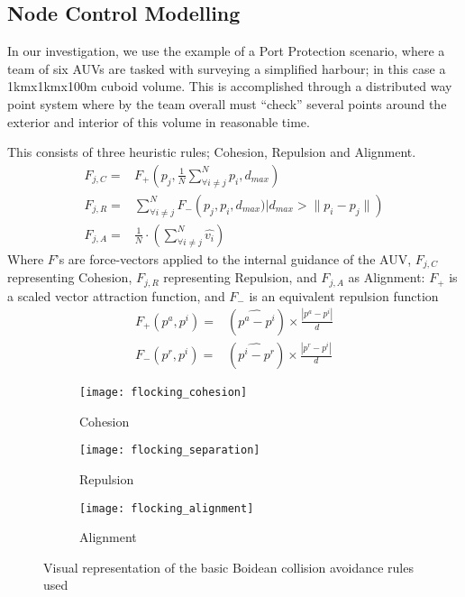 \subsection{Node Control Modelling}

In our investigation, we use the example of a Port Protection scenario, where a team of six AUVs are tasked with surveying a simplified harbour; in this case a 1kmx1kmx100m cuboid volume.
This is accomplished through a distributed way point system where by the team overall must ``check'' several points around the exterior and interior of this volume in reasonable time.

This consists of three heuristic rules; Cohesion, Repulsion and Alignment.
\begin{align}
  F_{j,C}=& F_+\left(p_j, \frac{1}{N}\sum\limits_{\forall i \ne j}^N{p_i}, d_{max}\right)\label{eq:fa}\\
  F_{j,R}=& \sum\limits_{\forall i \ne j}^N F_-\left(p_j, p_i, d_{max}) \big| d_{max}>\|p_i-p_j\|\right)\label{eq:fr}\\
  F_{j,A}=& \frac{1}{N}\cdot\left(\sum\limits_{\forall i \ne j}^N \hat{v_i}\right)\label{eq:fc}
\end{align}
Where $F$'s are force-vectors applied to the internal guidance of the AUV, $F_{j,C}$ representing Cohesion, $F_{j,R}$ representing Repulsion, and $F_{j,A}$ as Alignment: $F_+$ is a scaled vector attraction function, and $F_-$ is an equivalent repulsion function
\begin{align}
  F_+(p^a, p^i)=&(\widehat{p^a-p^i}) \times \frac{|p^a-p^i|}{d}\\
  F_-(p^r, p^i)=&(\widehat{p^i-p^r}) \times \frac{|p^r-p^i|}{d}
\end{align}

\begin{figure*}
  \centering
  \begin{subfigure}[t]{0.3\textwidth}
    \centering
    \texttt{[image: flocking\_cohesion]}
    \caption{Cohesion}
  \end{subfigure}
  \begin{subfigure}[t]{0.3\textwidth}
    \centering
    \texttt{[image: flocking\_separation]}
    \caption{Repulsion}
  \end{subfigure}
  \begin{subfigure}[t]{0.3\textwidth}
    \centering
    \texttt{[image: flocking\_alignment]}
    \caption{Alignment}
  \end{subfigure}
  \caption{Visual representation of the basic Boidean collision avoidance rules used}
  \label{fig:boids}
\end{figure*}


